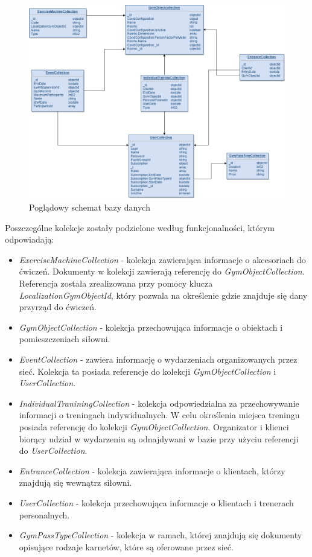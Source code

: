 \documentclass[a4paper,twoside,12pt]{book}
\begin{document}
\begin{figure}[htbp]
	\centering
	\includegraphics[width=1\linewidth]{../diagramy/schemat_bazy}
	\caption{Poglądowy schemat bazy danych}
	\label{fig:schematbazy}
\end{figure}

Poszczególne kolekcje zostały podzielone według funkcjonalności, którym odpowiadają:
\begin{itemize}
	\item \textit{ExerciseMachineCollection} - kolekcja zawierająca informacje o akcesoriach do ćwiczeń. Dokumenty w kolekcji zawierają referencję do \textit{GymObjectCollection}. Referencja została zrealizowana przy pomocy klucza \textit{LocalizationGymObjectId}, który pozwala na określenie gdzie znajduje się dany przyrząd do ćwiczeń.
	\item \textit{GymObjectCollection} - kolekcja przechowująca informacje o obiektach i pomieszczeniach siłowni.
	\item \textit{EventCollection} - zawiera informację o wydarzeniach organizowanych przez sieć. Kolekcja ta posiada referencje do kolekcji \textit{GymObjectCollection} i \textit{UserCollection}.
	\item \textit{IndividualTraniningCollection} - kolekcja odpowiedzialna za przechowywanie informacji o treningach indywidualnych. W celu określenia miejsca treningu posiada referencję do kolekcji \textit{GymObjectCollection}. Organizator i klienci biorący udział w wydarzeniu są odnajdywani w bazie przy użyciu referencji do \textit{UserCollection}.
	\item \textit{EntranceCollection} - kolekcja zawierająca informacje o klientach, którzy znajdują się wewnątrz siłowni.
	\item \textit{UserCollection} - kolekcja przechowująca informacje o klientach i trenerach personalnych.
	\item \textit{GymPassTypeCollection} - kolekcja w ramach, której znajdują się dokumenty opisujące rodzaje karnetów, które są oferowane przez sieć.
\end{itemize}
\end{document}
